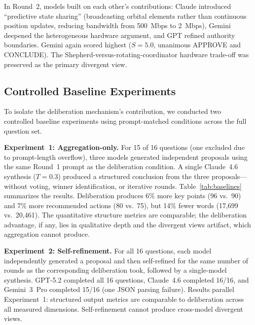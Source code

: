 \documentclass[11pt,a4paper]{article}
\begin{document}
In Round~2, models built on each other's contributions: Claude introduced ``predictive state sharing'' (broadcasting orbital elements rather than continuous position updates, reducing bandwidth from 500~Mbps to 2~Mbps), Gemini deepened the heterogeneous hardware argument, and GPT refined authority boundaries. Gemini again scored highest ($S = 5.0$, unanimous APPROVE and CONCLUDE). The Shepherd-versus-rotating-coordinator hardware trade-off was preserved as the primary divergent view.

\subsection{Controlled Baseline Experiments}
\label{sec:baselines}

To isolate the deliberation mechanism's contribution, we conducted two controlled baseline experiments using prompt-matched conditions across the full question set.

\textbf{Experiment~1: Aggregation-only.} For 15 of 16 questions (one excluded due to prompt-length overflow), three models generated independent proposals using the same Round~1 prompt as the deliberation condition. A single Claude~4.6 synthesis ($T = 0.3$) produced a structured conclusion from the three proposals---without voting, winner identification, or iterative rounds. Table~\ref{tab:baselines} summarizes the results. Deliberation produces 6\% more key points (96 vs.\ 90) and 7\% more recommended actions (80 vs.\ 75), but 14\% fewer words (17{,}699 vs.\ 20{,}461). The quantitative structure metrics are comparable; the deliberation advantage, if any, lies in qualitative depth and the divergent views artifact, which aggregation cannot produce.

\textbf{Experiment~2: Self-refinement.} For all 16 questions, each model independently generated a proposal and then self-refined for the same number of rounds as the corresponding deliberation took, followed by a single-model synthesis. GPT-5.2 completed all 16 questions, Claude~4.6 completed 16/16, and Gemini~3~Pro completed 15/16 (one JSON parsing failure). Results parallel Experiment~1: structured output metrics are comparable to deliberation across all measured dimensions. Self-refinement cannot produce cross-model divergent views.
\end{document}
